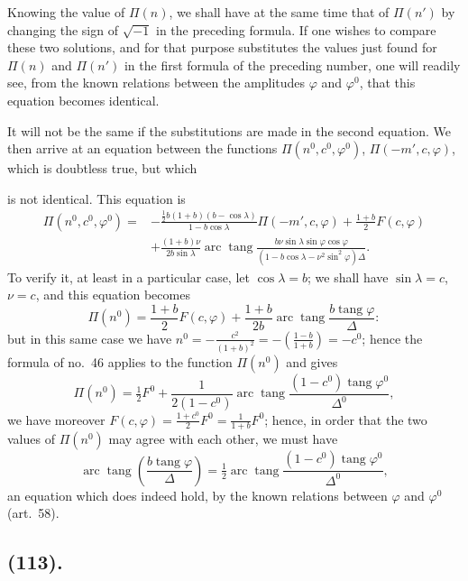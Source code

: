 \documentclass{article}
\begin{document}
Knowing the value of $\Pi(n)$, we shall have at the same time that of $\Pi(n')$ by changing the sign of $\sqrt{-1}$ in the preceding formula. If one wishes to compare these two solutions, and for that purpose substitutes the values just found for $\Pi(n)$ and $\Pi(n')$ in the first formula of the preceding number, one will readily see, from the known relations between the amplitudes $\varphi$ and $\varphi^{0}$, that this equation becomes identical.

It will not be the same if the substitutions are made in the second equation. We then arrive at an equation between the functions $\Pi(n^{0},c^{0},\varphi^{0})$, $\Pi(-m',c,\varphi)$, which is doubtless true, but which

is not identical. This equation is
\[ \begin{aligned} \Pi(n^{0},c^{0},\varphi^{0})={}&-\frac{\tfrac{1}{2}b(1+b)(b-\cos\lambda)}{1-b\cos\lambda}\Pi(-m',c,\varphi)+\frac{1+b}{2}F(c,\varphi)\\ &+\frac{(1+b)\nu}{2b\sin\lambda}\operatorname{arc}\operatorname{tang}\frac{b\nu\sin\lambda\sin\varphi\cos\varphi}{(1-b\cos\lambda-\nu^{2}\sin^{2}\varphi)\Delta}. \end{aligned} \]
To verify it, at least in a particular case, let $\cos\lambda=b$; we shall have $\sin\lambda=c$, $\nu=c$, and this equation becomes
\[ \Pi(n^{0})=\frac{1+b}{2}F(c,\varphi)+\frac{1+b}{2b}\operatorname{arc}\operatorname{tang}\frac{b\operatorname{tang}\varphi}{\Delta}: \]
but in this same case we have $n^{0}=-\frac{c^{2}}{(1+b)^{2}}=-\left(\frac{1-b}{1+b}\right)=-c^{0}$; hence the formula of no.\ 46 applies to the function $\Pi(n^{0})$ and gives
\[ \Pi(n^{0})=\tfrac{1}{2}F^{0}+\frac{1}{2(1-c^{0})}\operatorname{arc}\operatorname{tang}\frac{(1-c^{0})\operatorname{tang}\varphi^{0}}{\Delta^{0}}, \]
we have moreover $F(c,\varphi)=\frac{1+c^{0}}{2}F^{0}=\frac{1}{1+b}F^{0}$; hence, in order that the two values of $\Pi(n^{0})$ may agree with each other, we must have
\[ \operatorname{arc}\operatorname{tang}\left(\frac{b\operatorname{tang}\varphi}{\Delta}\right)=\tfrac{1}{2}\operatorname{arc}\operatorname{tang}\frac{(1-c^{0})\operatorname{tang}\varphi^{0}}{\Delta^{0}}, \]
an equation which does indeed hold, by the known relations between $\varphi$ and $\varphi^{0}$ (art.\ 58).

\subsection*{(113).}
\end{document}
